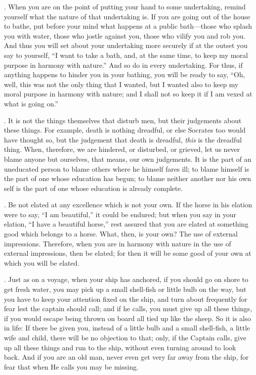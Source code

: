 . When you are on the point of putting your hand to some undertaking, remind yourself what the nature of that undertaking is. If you are going out of the house to bathe, put before your mind what happens at a public bath—those who splash you with water, those who jostle against you, those who vilify you and rob you. And thus you will set about your undertaking more securely if at the outset you say to yourself, ``I want to take a bath, and, at the same time, to keep my moral purpose in harmony with nature.'' And so do in every undertaking. For thus, if anything happens to hinder you in your bathing, you will be ready to say, ``Oh, well, this was not the only thing that I wanted, but I wanted also to keep my moral purpose in harmony with nature; and I shall not so keep it if I am vexed at what is going on.''

. It is not the things themselves that disturb men, but their judgements about these things. For example, death is nothing dreadful, or else Socrates too would have thought so, but the judgement that death is dreadful, \emph{this} is the dreadful thing. When, therefore, we are hindered, or disturbed, or grieved, let us never blame anyone but ourselves, that means, our own judgements. It is the part of an uneducated person to blame others where he himself fares ill; to blame himself is the part of one whose education has begun; to blame neither another nor his own self is the part of one whose education is already complete.

. Be not elated at any excellence which is not your own. If the horse in his elation were to say, ``I am beautiful,'' it could be endured; but when you say in your elation, ``I have a beautiful horse,'' rest assured that you are elated at something good which belongs to a horse. What, then, is your own? The use of external impressions. Therefore, when you are in harmony with nature in the use of external impressions, then be elated; for then it will be some good of your own at which you will be elated.

. Just as on a voyage, when your ship has anchored, if you should go on shore to get fresh water, you may pick up a small shell-fish or little bulb on the way, but you have to keep your attention fixed on the ship, and turn about frequently for fear lest the captain should call; and if he calls, you must give up all these things, if you would escape being thrown on board all tied up like the sheep. So it is also in life: If there be given you, instead of a little bulb and a small shell-fish, a little wife and child, there will be no objection to that; only, if the Captain calls, give up all these things and run to the ship, without even turning around to look back. And if you are an old man, never even get very far away from the ship, for fear that when He calls you may be missing.

